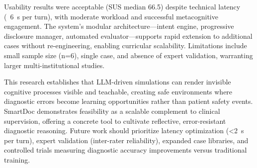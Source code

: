 Usability results were acceptable (SUS median 66.5) despite technical latency (~6~s per turn), with moderate
workload and successful metacognitive engagement. The system's modular architecture—intent engine, progressive
disclosure manager, automated evaluator—supports rapid extension to additional cases without re-engineering,
enabling curricular scalability. Limitations include small sample size (n=6), single case, and absence of expert
validation, warranting larger multi-institutional studies.

This research establishes that LLM-driven simulations can render invisible cognitive processes visible and
teachable, creating safe environments where diagnostic errors become learning opportunities rather than patient
safety events. SmartDoc demonstrates feasibility as a scalable complement to clinical supervision, offering a
concrete tool to cultivate reflective, error-resistant diagnostic reasoning. Future work should prioritize latency
optimization (<2~s per turn), expert validation (inter-rater reliability), expanded case libraries, and controlled
trials measuring diagnostic accuracy improvements versus traditional training.


\newpage
